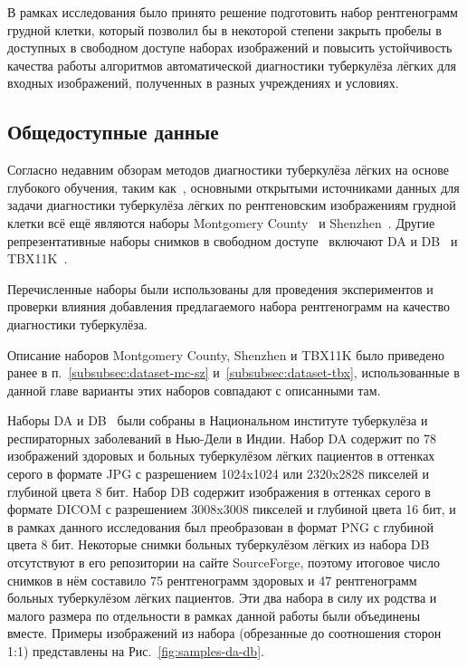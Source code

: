 В рамках исследования было принято решение подготовить набор рентгенограмм грудной клетки, который позволил бы в некоторой степени закрыть пробелы в доступных в свободном доступе наборах изображений и повысить устойчивость качества работы алгоритмов автоматической диагностики туберкулёза лёгких для входных изображений, полученных в разных учреждениях и условиях. 

\subsection{Общедоступные данные}

Согласно недавним обзорам методов диагностики туберкулёза лёгких на основе глубокого обучения, таким как~\cite{oloko2022systematic, zeyu2022review, singh2022evolution}, основными открытыми источниками данных для задачи диагностики туберкулёза лёгких по рентгеновским изображениям грудной клетки всё ещё являются наборы Montgomery County~\cite{candemir2013lung} и Shenzhen~\cite{jaeger2013automatic}. Другие репрезентативные наборы снимков в свободном доступе~\cite{santosh2022advances} включают DA и DB~\cite{chauhan2014role} и TBX11K~\cite{liu2020rethinking}.

Перечисленные наборы были использованы для проведения экспериментов и проверки влияния добавления предлагаемого набора рентгенограмм на качество диагностики туберкулёза.

Описание наборов Montgomery County, Shenzhen и TBX11K было приведено ранее в п.~\ref{subsubsec:dataset-mc-sz} и~\ref{subsubsec:dataset-tbx}, использованные в данной главе варианты этих наборов совпадают с описанными там.


Наборы DA и DB~\cite{chauhan2014role} были собраны в Национальном институте туберкулёза и респираторных заболеваний в Нью-Дели в Индии. Набор DA содержит по 78 изображений здоровых и больных туберкулёзом лёгких пациентов в оттенках серого в формате JPG с разрешением 1024x1024 или 2320x2828 пикселей и глубиной цвета 8 бит. Набор DB содержит изображения в оттенках серого в формате DICOM с разрешением 3008x3008 пикселей и глубиной цвета 16 бит, и в рамках данного исследования был преобразован в формат PNG с глубиной цвета 8 бит. Некоторые снимки больных туберкулёзом лёгких из набора DB отсутствуют в его репозитории на сайте SourceForge, поэтому итоговое число снимков в нём составило 75 рентгенограмм здоровых и 47 рентгенограмм больных туберкулёзом лёгких пациентов. Эти два набора в силу их родства и малого размера по отдельности в рамках данной работы были объединены вместе. Примеры изображений из набора (обрезанные до соотношения сторон 1:1) представлены на Рис.~\ref{fig:samples-da-db}.

